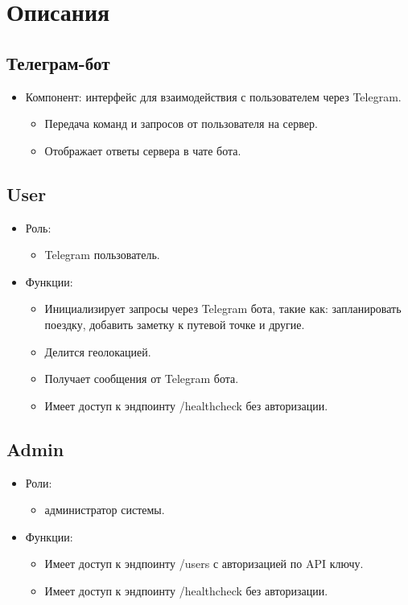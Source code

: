 \documentclass[areasetadvanced]{scrartcl}
\begin{document}
\thispagestyle{empty}
\newpage
\tableofcontents
\newpage
\section{Описания}
\subsection{Телеграм-бот}
\begin{itemize}
  \item Компонент: интерфейс для взаимодействия с пользователем через Telegram. 
  \begin{itemize}
    \item Передача команд и запросов от пользователя на сервер.
    \item Отображает ответы сервера в чате бота.
  \end{itemize}
\end{itemize}

\subsection{User}
\begin{itemize}
  \item Роль: 
  \begin{itemize}
    \item Telegram пользователь.
  \end{itemize}
  \item Функции: 
  \begin{itemize}
    \item Инициализирует запросы через Telegram бота, такие как: запланировать поездку, добавить заметку к путевой точке и другие.
    \item Делится геолокацией.
    \item Получает сообщения от Telegram бота.
    \item Имеет доступ к эндпоинту /healthcheck без авторизации.
  \end{itemize}
\end{itemize}

\subsection{Admin}
\begin{itemize}
  \item Роли: 
  \begin{itemize}
    \item администратор системы.
  \end{itemize}
  \item Функции: 
  \begin{itemize}
    \item Имеет доступ к эндпоинту /users с авторизацией по API ключу.
    \item Имеет доступ к эндпоинту /healthcheck без авторизации.
  \end{itemize}
\end{itemize}
\end{document}
